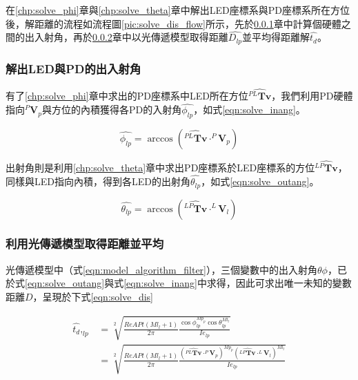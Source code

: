    在\ref{chp:solve_phi}章與\ref{chp:solve_theta}章中解出LED座標系與PD座標系所在方位後，解距離的流程如流程圖\ref{pic:solve_dis_flow}所示，先於\ref{chp:solve_ang}章中計算個硬體之間的出入射角，再於\ref{chp:dis_average}章中以光傳遞模型取得距離$\hat{D_{lp}}$並平均得距離解$\hat{t_d}$。
    

        


        \subsubsection{解出LED與PD的出入射角}
        \label{chp:solve_ang}

        有了\ref{chp:solve_phi}章中求出的PD座標系中LED所在方位$\hat{{^{PL}\boldsymbol{Tv}}}$，我們利用PD硬體指向$^P\boldsymbol{V}_p$與方位的內積獲得各PD的入射角$\hat{\phi_{lp}}$，如式\ref{eqn:solve_inang}。
        
        \begin{equation}
            \label{eqn:solve_inang}
            \hat{\phi_{lp}} = \arccos(\hat{{^{PL}\boldsymbol{Tv}}}\cdot ^P\boldsymbol{V}_p)
        \end{equation}
        
        \noindent 出射角則是利用\ref{chp:solve_theta}章中求出PD座標系於LED座標系的方位$\hat{{^{LP}\boldsymbol{Tv}}}$，同樣與LED指向內積，得到各LED的出射角$\hat{\theta_{lp}}$，如式\ref{eqn:solve_outang}。

        \begin{equation}
            \label{eqn:solve_outang}
            \hat{\theta_{lp}} = \arccos(\hat{{^{LP}\boldsymbol{Tv}}}\cdot ^L\boldsymbol{V}_l)
        \end{equation}

        \subsubsection{利用光傳遞模型取得距離並平均}
        \label{chp:dis_average}

        光傳遞模型中（式\ref{eqn:model_algorithm_filter}），三個變數中的出入射角$\theta\phi$，已於式\ref{eqn:solve_outang}與式\ref{eqn:solve_inang}中求得，因此可求出唯一未知的變數距離$D$，呈現於下式\ref{eqn:solve_dis}

        \begin{equation}
            \label{eqn:solve_dis}
            \begin{aligned}
            \hat{t_d },_{lp} &= \sqrt[2]{\frac{ReAPt (Ml_{l}+1)}{2\pi}
                \frac{\cos\phi_{lp}^{Mp_{p}}\cos \theta_{lp}^{Ml_{l}} }
                {Ie_{lp}}
            }\\
            & = \sqrt[2]
            {
                \frac{ReAPt (Ml_{l}+1)}{2\pi}
                \frac{
                    (\hat{{^{PL}\boldsymbol{Tv}}}\cdot ^P\boldsymbol{V}_p)^{Mp_{p}}
                    (\hat{{^{LP}\boldsymbol{Tv}}}\cdot ^L\boldsymbol{V}_l)^{Ml_{l}} }
                {Ie_{lp}}
            }
            \end{aligned}
        \end{equation}


